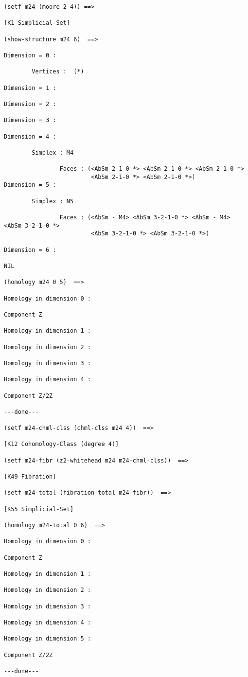 {\footnotesize\begin{verbatim}
(setf m24 (moore 2 4)) ==>

[K1 Simplicial-Set]

(show-structure m24 6)  ==>

Dimension = 0 :

        Vertices :  (*)

Dimension = 1 :

Dimension = 2 :

Dimension = 3 :

Dimension = 4 :

        Simplex : M4

                Faces : (<AbSm 2-1-0 *> <AbSm 2-1-0 *> <AbSm 2-1-0 *>
                         <AbSm 2-1-0 *> <AbSm 2-1-0 *>)
Dimension = 5 :

        Simplex : N5

                Faces : (<AbSm - M4> <AbSm 3-2-1-0 *> <AbSm - M4> <AbSm 3-2-1-0 *>
                         <AbSm 3-2-1-0 *> <AbSm 3-2-1-0 *>)

Dimension = 6 :

NIL

(homology m24 0 5)  ==>

Homology in dimension 0 :

Component Z

Homology in dimension 1 :

Homology in dimension 2 :

Homology in dimension 3 :

Homology in dimension 4 :

Component Z/2Z

---done---

(setf m24-chml-clss (chml-clss m24 4))  ==>

[K12 Cohomology-Class (degree 4)]

(setf m24-fibr (z2-whitehead m24 m24-chml-clss))  ==>

[K49 Fibration]

(setf m24-total (fibration-total m24-fibr))  ==>

[K55 Simplicial-Set]

(homology m24-total 0 6)  ==>

Homology in dimension 0 :

Component Z

Homology in dimension 1 :

Homology in dimension 2 :

Homology in dimension 3 :

Homology in dimension 4 :

Homology in dimension 5 :

Component Z/2Z

---done---
\end{verbatim}}

